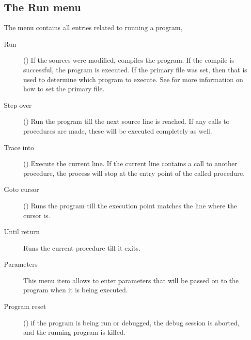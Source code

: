 \subsection{The Run menu}
\label{se:menurun}
The  menu contains all entries related to running a program,
\begin{description}
\item[Run] ()
If the sources were modified, compiles the program. If the compile is
successful, the program is executed. If the primary file  was set, then 
that is used to determine which program to execute. See 
for more information on how to set the primary file.
\item[Step over] ()
Run the program till the next source line is reached. If any calls to 
procedures are made, these will be executed completely as well.
\item[Trace into] ()
Execute the current line. If the current line contains a call to another
procedure, the process will stop at the entry point of the called procedure.
\item[Goto cursor] ()
Runs the program till the execution point matches the line where the cursor
is.
\item[Until return]
Runs the current procedure till it exits.
\item[Parameters]
This menu item allows to enter parameters that will be passed on to the
program when it is being executed.
\item[Program reset] () if the program is being run or 
debugged, the debug session is aborted, and the running program is killed.
\end{description}
%
%
